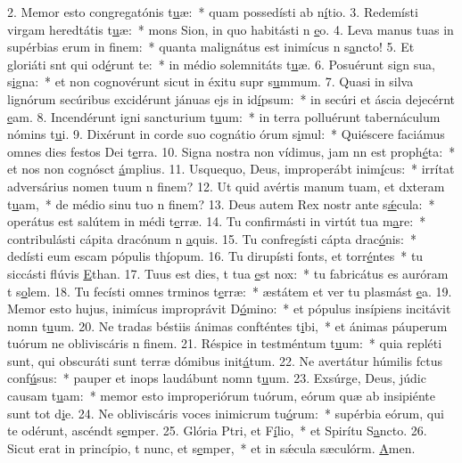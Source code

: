 2. Memor esto congregatónis t\uline{u}æ:~* quam possedísti ab n\uline{í}tio.
3. Redemísti virgam heredtátis t\uline{u}æ:~* mons Sion, in quo habitásti n \uline{e}o.
4. Leva manus tuas in supérbias erum in f\uline{i}nem:~* quanta malignátus est inimícus n s\uline{a}ncto!
5. Et gloriáti snt qui od\uline{é}runt te:~* in médio solemnitáts t\uline{u}æ.
6. Posuérunt sign sua, s\uline{i}gna:~* et non cognovérunt sicut in éxitu supr s\uline{u}mmum.
7. Quasi in silva lignórum secúribus excidérunt jánuas ejs in id\uline{í}psum:~* in secúri et áscia dejecérnt \uline{e}am.
8. Incendérunt igni sancturium t\uline{u}um:~* in terra polluérunt tabernáculum nómins t\uline{u}i.
9. Dixérunt in corde suo cognátio órum s\uline{i}mul:~* Quiéscere faciámus omnes dies festos Dei  t\uline{e}rra.
10. Signa nostra non vídimus, jam nn est proph\uline{é}ta:~* et nos non cognósct \uline{á}mplius.
11. Usquequo, Deus, improperábt inim\uline{í}cus:~* irrítat adversárius nomen tuum n f\uline{i}nem?
12. Ut quid avértis manum tuam, et dxteram t\uline{u}am,~* de médio sinu tuo n f\uline{i}nem?
13. Deus autem Rex nostr ante s\uline{ǽ}cula:~* operátus est salútem in médi t\uline{e}rræ.
14. Tu confirmásti in virtút tua m\uline{a}re:~* contribulásti cápita dracónum n \uline{a}quis.
15. Tu confregísti cápta drac\uline{ó}nis:~* dedísti eum escam pópulis th\uline{í}opum.
16. Tu dirupísti fonts, et torr\uline{é}ntes~* tu siccásti flúvis \uline{E}than.
17. Tuus est dies, t tua \uline{e}st nox:~* tu fabricátus es auróram t s\uline{o}lem.
18. Tu fecísti omnes trminos t\uline{e}rræ:~* æstátem et ver tu plasmást \uline{e}a.
19. Memor esto hujus, inimícus improprávit D\uline{ó}mino:~* et pópulus insípiens incitávit nomn t\uline{u}um.
20. Ne tradas béstiis ánimas confténtes t\uline{i}bi,~* et ánimas páuperum tuórum ne obliviscáris n f\uline{i}nem.
21. Réspice in testméntum t\uline{u}um:~* quia repléti sunt, qui obscuráti sunt terræ dómibus init\uline{á}tum.
22. Ne avertátur húmilis fctus conf\uline{ú}sus:~* pauper et inops laudábunt nomn t\uline{u}um.
23. Exsúrge, Deus, júdic causam t\uline{u}am:~* memor esto improperiórum tuórum, eórum quæ ab insipiénte sunt tot d\uline{i}e.
24. Ne obliviscáris voces inimicrum tu\uline{ó}rum:~* supérbia eórum, qui te odérunt, ascéndt s\uline{e}mper.
25. Glória Ptri, et F\uline{í}lio,~* et Spirítu S\uline{a}ncto.
26. Sicut erat in princípio, t nunc, et s\uline{e}mper,~* et in sǽcula sæculórm. \uline{A}men.
